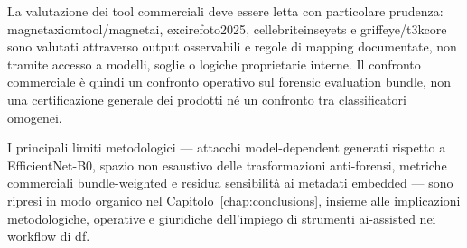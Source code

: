 La valutazione dei tool commerciali deve essere letta con particolare prudenza:
\gls{magnetaxiomtool}/\gls{magnetai}, \gls{excirefoto2025},
\gls{cellebriteinseyets} e \gls{griffeye}/\gls{t3kcore} sono valutati attraverso
output osservabili e regole di mapping documentate, non tramite accesso a
modelli, soglie o logiche proprietarie interne. Il confronto commerciale è quindi
un confronto operativo sul forensic evaluation bundle, non una certificazione
generale dei prodotti né un confronto tra classificatori omogenei.

I principali limiti metodologici --- attacchi model-dependent generati rispetto a
EfficientNet-B0, spazio non esaustivo delle trasformazioni anti-forensi, metriche
commerciali bundle-weighted e residua sensibilità ai metadati embedded --- sono
ripresi in modo organico nel Capitolo~\ref{chap:conclusions}, insieme alle
implicazioni metodologiche, operative e giuridiche dell'impiego di strumenti
\gls{ai}-assisted nei workflow di \gls{df}.
